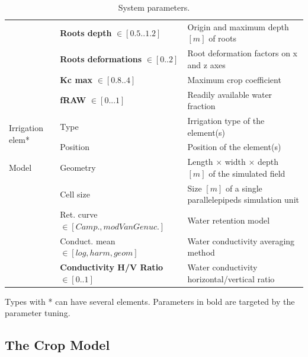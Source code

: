 \begin{table}[H]
\begin{tabular}{p{1.2cm}p{5cm}p{7.5cm}}
		& \textbf{Roots depth} $\in [0.5..1.2]$ &  Origin and maximum depth $[m]$ of roots\\
		& \textbf{Roots deformations} $\in [0..2]$ &  Root deformation factors on x and z axes\\ 
		& \textbf{Kc max} $\in [0.8..4]$ &  Maximum crop coefficient\\
		& \textbf{fRAW} $\in [0...1]$ & Readily available water fraction\\
		\hline%
		\multirow{2}{1cm}{Irrigation elem*} & Type & Irrigation type of the element(s) \\
		& Position & Position of the element(s)\\
		\hline%
		Model & Geometry  & Length $\times$ width $\times$ depth $[m]$ of the simulated field\\
		& Cell size  &  Size $[m]$ of a single parallelepipeds simulation unit\\%
		& Ret. curve $\in [Camp., mod Van Genuc.]$ & Water retention model\\ 
	    & Conduct. mean $\in [log, harm, geom]$ &  Water conductivity averaging method \\ %
		& \textbf{Conductivity H/V Ratio} $\in [0..1]$  &  Water conductivity horizontal/vertical ratio \\
		\bottomrule
	\end{tabular}%
	\begin{tablenotes}
      \scriptsize
      \item Types with * can have several elements. Parameters in bold are targeted by the parameter tuning.
    \end{tablenotes}
	\caption{System parameters.}
	\label{tab:parameter}%
\end{table}%

\subsection{The Crop Model}

\newcommand{\Wt}{$\overrightarrow{W}$}
\newcommand{\It}{$\overrightarrow{I}$}
\newcommand{\SMt}{$\overrightarrow{SM}$}

